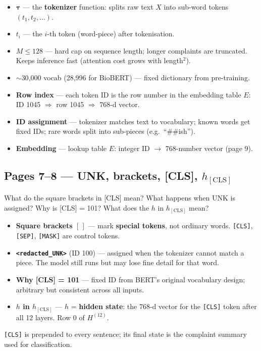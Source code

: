 \documentclass[11pt]{article}
\begin{document}
\begin{answerbox}
\begin{itemize}
  \item $\boldsymbol{\tau}$ --- the \textbf{tokenizer} function: splits raw text $X$ into sub-word tokens $(t_1, t_2, \ldots)$.
  \item $t_i$ --- the $i$-th token (word-piece) after tokenisation.
  \item $M \leq 128$ --- hard cap on sequence length; longer complaints are truncated. Keeps inference fast (attention cost grows with length$^2$).
  \item $\sim$30{,}000 vocab (28{,}996 for BioBERT) --- fixed dictionary from pre-training.
  \item \textbf{Row index} --- each token ID is the row number in the embedding table $E$: ID 1045 $\Rightarrow$ row 1045 $\Rightarrow$ 768-d vector.
  \item \textbf{ID assignment} --- tokenizer matches text to vocabulary; known words get fixed IDs; rare words split into sub-pieces (e.g.\ ``\#\#ish'').
  \item \textbf{Embedding} --- lookup table $E$: integer ID $\to$ 768-number vector (page 9).
\end{itemize}
\end{answerbox}

\subsection{Pages 7--8 --- UNK, brackets, [CLS], $h_{[\mathrm{CLS}]}$}

\begin{questionbox}
What do the square brackets in [CLS] mean? What happens when UNK is assigned? Why is [CLS] = 101? What does the $h$ in $h_{[\mathrm{CLS}]}$ mean?
\end{questionbox}

\begin{answerbox}
\begin{itemize}
  \item \textbf{Square brackets $[\,]$} --- mark \textbf{special tokens}, not ordinary words. \texttt{[CLS]}, \texttt{[SEP]}, \texttt{[MASK]} are control tokens.
  \item \textbf{\texttt{<redacted\_UNK>}} (ID 100) --- assigned when the tokenizer cannot match a piece. The model still runs but may lose fine detail for that word.
  \item \textbf{Why [CLS] = 101} --- fixed ID from BERT's original vocabulary design; arbitrary but consistent across all inputs.
  \item \textbf{$h$ in $h_{[\mathrm{CLS}]}$} --- $h$ = \textbf{hidden state}: the 768-d vector for the \texttt{[CLS]} token after all 12 layers. Row 0 of $H^{(12)}$.
\end{itemize}
\texttt{[CLS]} is prepended to every sentence; its final state is the complaint summary used for classification.
\end{answerbox}
\end{document}
